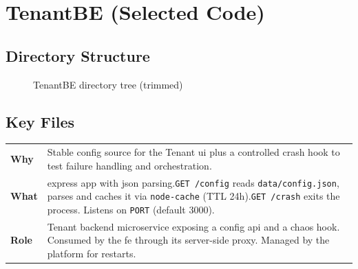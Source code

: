 \documentclass[11pt, a4paper, oneside, listof=totoc]{scrartcl}
\makeatletter
\newcommand{\codesummary}[3]{%
    \vspace{0.4\baselineskip}%
    \noindent\begin{tabularx}{\linewidth}{@{}>{\bfseries}l X@{}}
    Why  & #1\\
    What & #2\\
    Role & #3\\
    \end{tabularx}%
    \vspace{0.2\baselineskip}%
}
\makeatother
\begin{document}
        \clearpage

        \section{TenantBE (Selected Code)}\label{app:tenantbe}
            \subsection{Directory Structure}
            \begin{figure}[H]
                \centering
                \caption{TenantBE directory tree (trimmed)}\label{fig:tenantbe-tree}
            \end{figure}

        \clearpage

            \subsection{Key Files}
                \codesummary
                    {Stable config source for the Tenant \gls{ui} plus a controlled crash hook to test failure handling and orchestration.}
                    {\gls{express} app with \gls{json} parsing.\@\texttt{GET /config} reads \texttt{data/config.json}, parses and caches it via \texttt{node-cache} (TTL 24h).\@\texttt{GET /crash} exits the process. Listens on \texttt{PORT} (default 3000).}
                    {Tenant backend microservice exposing a config \gls{api} and a chaos hook. Consumed by the \gls{fe} through its server-side proxy. Managed by the platform for restarts.}

        \clearpage
\end{document}
